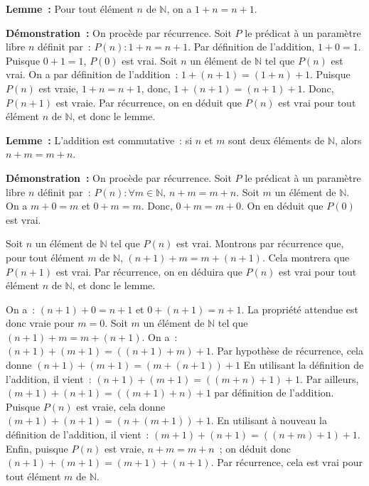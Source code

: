    \done 

\medskip

\noindent\textbf{Lemme :} Pour tout élément $n$ de $\mathbb{N}$, on a $1+n=n+1$. 

\medskip

\noindent\textbf{Démonstration :} On procède par récurrence. 
    Soit $P$ le prédicat à un paramètre libre $n$ définit par : $P(n): 1+n=n+1$. 
    Par définition de l'addition, $1+0=1$. 
    Puisque $0+1=1$, $P(0)$ est vrai.
    Soit $n$ un élément de $\mathbb{N}$ tel que $P(n)$ est vrai. 
    On a par définition de l'addition : $1+(n+1) = (1+n)+1$. 
    Puisque $P(n)$ est vraie, $1+n=n+1$, donc, $1+(n+1) = (n+1)+1$. 
    Donc, $P(n+1)$ est vraie. 
    Par récurrence, on en déduit que $P(n)$ est vrai pour tout élément $n$ de $\mathbb{N}$, et donc le lemme.

   \done 

\medskip

\noindent\textbf{Lemme :} L'addition est commutative : si $n$ et $m$ sont deux éléments de $\mathbb{N}$, alors $n+m=m+n$. 

\medskip

\noindent\textbf{Démonstration :} On procède par récurrence. 
    Soit $P$ le prédicat à un paramètre libre $n$ définit par : $P(n): \forall m \in \mathbb{N}, \, n+m=m+n$. 
    Soit $m$ un élément de $\mathbb{N}$. 
    On a $m+0=m$ et $0+m=m$. 
    Donc, $0+m=m+0$. 
    On en déduit que $P(0)$ est vrai. 

    Soit $n$ un élément de $\mathbb{N}$ tel que $P(n)$ est vrai. 
    Montrons par récurrence que, pour tout élément $m$ de $\mathbb{N}$, $(n+1)+m=m+(n+1)$. 
    Cela montrera que $P(n+1)$ est vrai. 
    Par récurrence, on en déduira que $P(n)$ est vrai pour tout élément $n$ de $\mathbb{N}$, et donc le lemme. 

    On a : $(n+1)+0 = n+1$ et $0+(n+1) = n+1$. 
    La propriété attendue est donc vraie pour $m = 0$.
    Soit $m$ un élément de $\mathbb{N}$ tel que $(n+1)+m=m+(n+1)$. 
    On a : $(n+1)+(m+1) = ((n+1)+m)+1$. 
    Par hypothèse de récurrence, cela donne $(n+1)+(m+1)=(m+(n+1))+1$
    En utilisant la définition de l'addition, il vient : $(n+1)+(m+1)=((m+n)+1)+1$. 
    Par ailleurs, $(m+1)+(n+1) = ((m+1)+n)+1$ par définition de l'addition. 
    Puisque $P(n)$ est vraie, cela donne $(m+1)+(n+1) = (n+(m+1))+1$. 
    En utilisant à nouveau la définition de l'addition, il vient : $(m+1)+(n+1) = ((n+m)+1)+1$.
    Enfin, puisque $P(n)$ est vraie, $n+m=m+n$ ; on déduit donc $(n+1)+(m+1)=(m+1)+(n+1)$. 
    Par récurrence, cela est vrai pour tout élément $m$ de $\mathbb{N}$.
    
